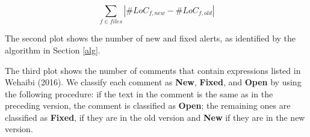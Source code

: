 \documentclass[
]{article}
\begin{document}
\begin{equation} \label{eq_change} \sum_{f \in files}{|\#LoC_{f, new} - \#LoC_{f, old}|} \end{equation}

The second plot shows the number of new and fixed alerts, as identified
by the algorithm in Section \ref{alg}. 

%
%
%

The third plot shows the number 
of comments that contain expressions listed in Wehaibi (2016). We classify
each comment as \textbf{New}, \textbf{Fixed}, and \textbf{Open} by using
the following procedure: if the text in the comment is the same as in the 
preceding version, the comment is classified as \textbf{Open}; the remaining
ones are classified as \textbf{Fixed}, if they are in the old version and 
\textbf{New} if they are in the new version.

%
%
\end{document}

